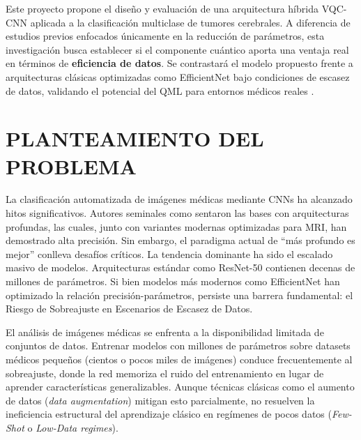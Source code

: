 \documentclass[12pt,letterpaper]{article}
\begin{document}
    Este proyecto propone el diseño y evaluación de una arquitectura híbrida VQC-CNN aplicada a la clasificación multiclase de tumores cerebrales.
    A diferencia de estudios previos enfocados únicamente en la reducción de parámetros, esta investigación busca establecer si el componente cuántico aporta una ventaja real en términos de \textbf{eficiencia de datos}.
    Se contrastará el modelo propuesto frente a arquitecturas clásicas optimizadas como EfficientNet \citep{tan2019efficientnet} bajo condiciones de escasez de datos, validando el potencial del QML para entornos médicos reales \citep{shahjalal2025hqcnn, khan2024brain}.

    \newpage
    \section{PLANTEAMIENTO DEL PROBLEMA}
    \vspace{-0.5cm}

    La clasificación automatizada de imágenes médicas mediante CNNs ha alcanzado hitos significativos.
    Autores seminales como \citet{he2016deep} sentaron las bases con arquitecturas profundas, las cuales, junto con variantes modernas optimizadas para MRI, han demostrado alta precisión.
    Sin embargo, el paradigma actual de ``más profundo es mejor'' conlleva desafíos críticos.
    La tendencia dominante ha sido el escalado masivo de modelos. Arquitecturas estándar como ResNet-50 contienen decenas de millones de parámetros.
    Si bien modelos más modernos como EfficientNet \citep{tan2019efficientnet} han optimizado la relación precisión-parámetros, persiste una barrera fundamental: el Riesgo de Sobreajuste en Escenarios de Escasez de Datos.

    El análisis de imágenes médicas se enfrenta a la disponibilidad limitada de conjuntos de datos.
    Entrenar modelos con millones de parámetros sobre datasets médicos pequeños (cientos o pocos miles de imágenes) conduce frecuentemente al sobreajuste, donde la red memoriza el ruido del entrenamiento en lugar de aprender características generalizables.
    Aunque técnicas clásicas como el aumento de datos (\textit{data augmentation}) mitigan esto parcialmente, no resuelven la ineficiencia estructural del aprendizaje clásico en regímenes de pocos datos (\textit{Few-Shot} o \textit{Low-Data regimes}).
\end{document}
